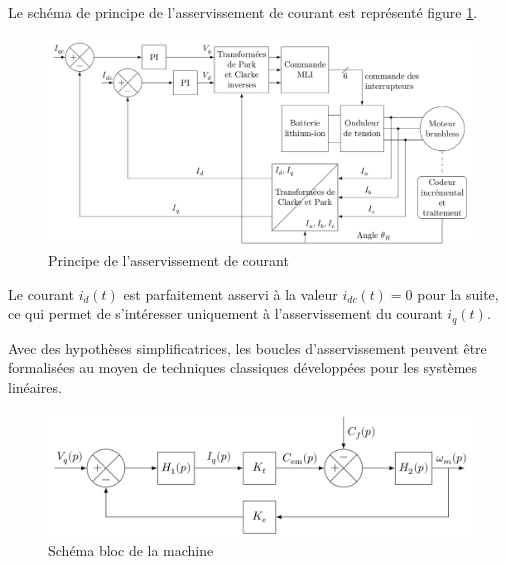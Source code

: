 Le schéma de principe de l'asservissement de courant est représenté figure \ref{fig13}.

\begin{figure}[!ht]
\begin{center}
 \includegraphics[width=0.8\linewidth]{img/fig13.png}
 \end{center}
  \caption{Principe de l'asservissement de courant}
\label{fig13}
\end{figure}

Le courant $i_d(t)$ est parfaitement asservi à la valeur $i_{dc}(t)=0$ pour la suite, ce qui permet de s'intéresser uniquement à l'asservissement du courant $i_q(t)$.

Avec des hypothèses simplificatrices, les boucles d'asservissement peuvent être formalisées au moyen de techniques classiques développées pour les systèmes linéaires.

\begin{figure}[!ht]
\begin{center}
 \includegraphics[width=0.7\linewidth]{img/fig14.png}
 \end{center}
  \caption{Schéma bloc de la machine}
\label{fig14}
\end{figure}

\vspace{-0.5cm}



